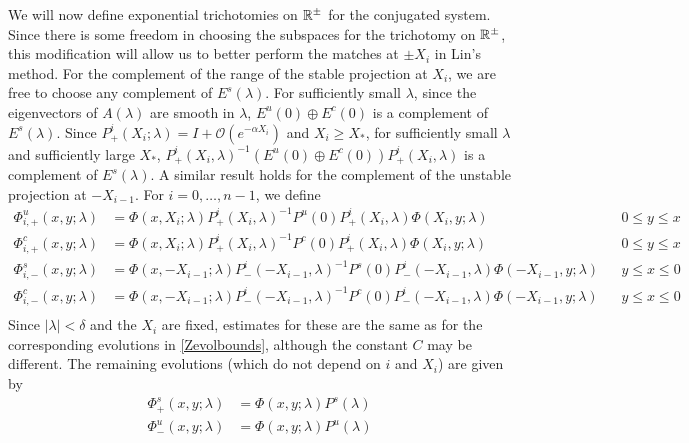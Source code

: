 \documentclass[thesis.tex]{subfiles}
\begin{document}
We will now define exponential trichotomies on $\mathbb{R}^\pm$ for the conjugated system. Since there is some freedom in choosing the subspaces for the trichotomy on $\mathbb{R}^\pm$, this modification will allow us to better perform the matches at $\pm X_i$ in Lin's method. For the complement of the range of the stable projection at $X_i$, we are free to choose any complement of $E^s(\lambda)$. For sufficiently small $\lambda$, since the eigenvectors of $A(\lambda)$ are smooth in $\lambda$, $E^u(0)\oplus E^c(0)$ is a complement of $E^s(\lambda)$. Since $P^i_+(X_i; \lambda) = I + \mathcal{O}(e^{-\alpha X_i})$ and $X_i \geq X_*$, for sufficiently small $\lambda$ and sufficiently large $X_*$, $P^i_+(X_i, \lambda)^{-1} ( E^u(0)\oplus E^c(0) ) P^i_+(X_i, \lambda)$ is a complement of $E^s(\lambda)$. A similar result holds for the complement of the unstable projection at $-X_{i-1}$. For $i = 0, \dots, n-1$, we define
\begin{equation}\label{Zevolmod}
\begin{aligned}
\Phi^u_{i,+}(x, y; \lambda) &= \Phi(x, X_i; \lambda) P^i_+(X_i, \lambda)^{-1}
P^u(0) P^i_+(X_i, \lambda) \Phi(X_i, y; \lambda) && 0 \leq y \leq x \\
\Phi^c_{i,+}(x, y; \lambda) &= \Phi(x, X_i; \lambda) P^i_+(X_i, \lambda)^{-1}
P^c(0) P^i_+(X_i, \lambda) \Phi(X_i, y; \lambda) && 0 \leq y \leq x \\
\Phi^s_{i,-}(x, y; \lambda) &= \Phi(x, -X_{i-1}; \lambda) P^i_-(-X_{i-1}, \lambda)^{-1}
P^s(0) P^i_-(-X_{i-1}, \lambda) \Phi(-X_{i-1}, y; \lambda) && y \leq x \leq 0 \\
\Phi^c_{i,-}(x, y; \lambda) &= \Phi(x, -X_{i-1}; \lambda) P^i_-(-X_{i-1}, \lambda)^{-1}
P^c(0) P^i_-(-X_{i-1}, \lambda) \Phi(-X_{i-1}, y; \lambda) && y \leq x \leq 0 \\
\end{aligned}
\end{equation}
Since $|\lambda| < \delta$ and the $X_i$ are fixed, estimates for these are the same as for the corresponding evolutions in \cref{Zevolbounds}, although the constant $C$ may be different. The remaining evolutions (which do not depend on $i$ and $X_i$) are given by
\begin{equation}\label{Zevolrest}
\begin{aligned}
\Phi^s_+(x, y; \lambda) &= \Phi(x, y; \lambda) P^s(\lambda) \\
\Phi^u_-(x, y; \lambda) &= \Phi(x, y; \lambda) P^u(\lambda)
\end{aligned}
\end{equation}
\end{document}
